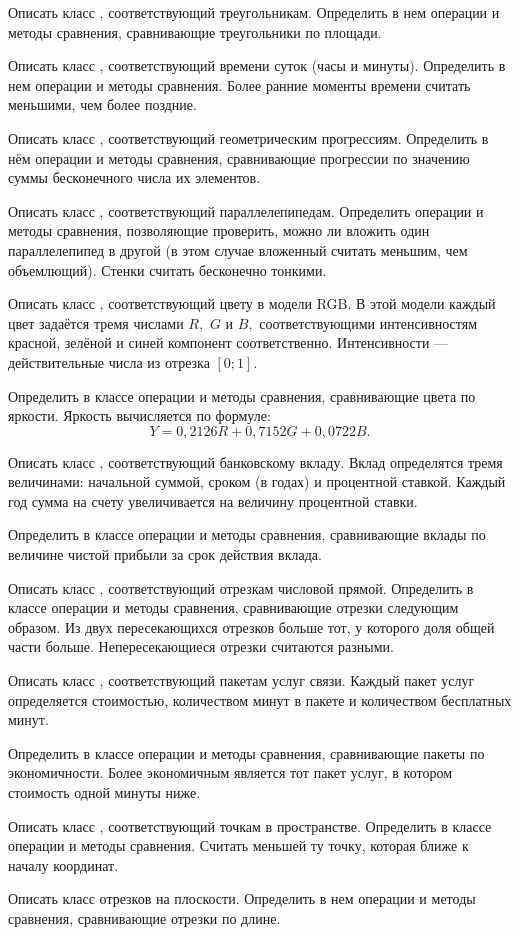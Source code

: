 \task Описать класс , соответствующий треугольникам.
Определить в нем операции и методы сравнения, сравнивающие
треугольники по площади.

\task Описать класс , соответствующий времени суток (часы и
минуты). Определить в нем операции и методы сравнения. Более ранние
моменты времени считать меньшими, чем более поздние.

\task Описать класс , соответствующий геометрическим
прогрессиям. Определить в нём операции и методы сравнения,
сравнивающие прогрессии по значению суммы бесконечного числа их
элементов.

\task Описать класс , соответствующий
параллелепипедам. Определить операции и методы сравнения, позволяющие
проверить, можно ли вложить один параллелепипед в другой (в этом
случае вложенный считать меньшим, чем объемлющий). Стенки считать
бесконечно тонкими.

\task Описать класс , соответствующий цвету в модели
RGB. В этой модели каждый цвет задаётся тремя числами $R,$ $G$ и $B,$
соответствующими интенсивностям красной, зелёной и синей компонент
соответственно. Интенсивности — действительные числа из отрезка
$[0; 1]$.

Определить в классе операции и методы сравнения, сравнивающие цвета по
яркости. Яркость вычисляется по формуле:
\[
Y = 0{,}2126 R + 0{,}7152 G + 0{,}0722 B.
\]

\task Описать класс , соответствующий банковскому
вкладу. Вклад определятся тремя величинами: начальной суммой, сроком
(в годах) и процентной ставкой. Каждый год сумма на счету
увеличивается на величину процентной ставки.

Определить в классе операции и методы сравнения, сравнивающие вклады
по величине чистой прибыли за срок действия вклада.

\task Описать класс , соответствующий отрезкам числовой
прямой. Определить в классе операции и методы сравнения, сравнивающие
отрезки следующим образом. Из двух пересекающихся отрезков больше тот,
у которого доля общей части больше. Непересекающиеся отрезки считаются
разными.

\task Описать класс , соответствующий пакетам услуг
связи. Каждый пакет услуг определяется стоимостью, количеством минут в
пакете и количеством бесплатных минут.

Определить в классе операции и методы сравнения, сравнивающие пакеты
по экономичности. Более экономичным является тот пакет услуг, в
котором стоимость одной минуты ниже.

\task Описать класс , соответствующий точкам в
пространстве.  Определить в классе операции и методы
сравнения. Считать меньшей ту точку, которая ближе к началу координат.

\task Описать класс  отрезков на плоскости. Определить в нем
операции и методы сравнения, сравнивающие отрезки по длине.
